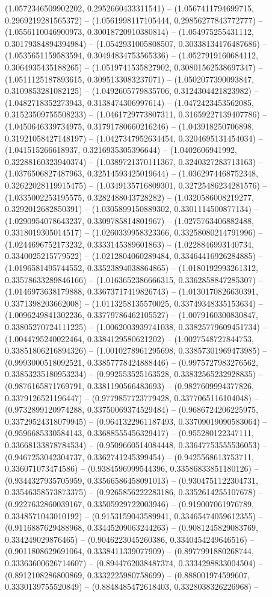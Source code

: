 (1.0572346509902202, 0.2952660433311541) -- (1.0567411794699715, 0.2969219281565372) -- (1.0561998117105444, 0.29856277843772777) -- (1.0556110046900973, 0.30018720910380814) -- (1.054975255431112, 0.30179384894394984) -- (1.0542931005808507, 0.30338134176487686) -- (1.0535651159583594, 0.30494834753565336) -- (1.0527919160684112, 0.3064935435188265) -- (1.0519741535827902, 0.30801562538697347) -- (1.0511125187893615, 0.3095133083237071) -- (1.0502077390093847, 0.3109853281082125) -- (1.0492605779835706, 0.3124304421823982) -- (1.0482718352273943, 0.3138474306997614) -- (1.0472423453562085, 0.31523509755508233) -- (1.0461729773807311, 0.31659227139407786) -- (1.0450646339734975, 0.31791780660216246) -- (1.043918250706898, 0.31921058427148197) -- (1.0427347952634454, 0.3204695131454034) -- (1.041515266618937, 0.3216935305396644) -- (1.0402606941992, 0.32288160323940374) -- (1.0389721370111367, 0.3240327283713163) -- (1.0376506827487963, 0.32514593425019644) -- (1.0362974468752348, 0.32622028119915475) -- (1.0349135716809301, 0.32725486234281576) -- (1.0335002253195575, 0.3282488043728282) -- (1.0320586008219277, 0.3292012682850391) -- (1.0305899150889302, 0.3301114500877134) -- (1.0290954078643237, 0.3309785814801967) -- (1.0275763406882488, 0.3318019305014517) -- (1.0260339958323366, 0.33258080214791996) -- (1.0244696752173232, 0.3333145389601863) -- (1.0228846993140734, 0.3340025215779522) -- (1.0212804060289484, 0.33464416926284885) -- (1.0196581495744552, 0.33523894038864865) -- (1.0180192993261312, 0.33578633289846166) -- (1.0163652386666315, 0.3362858847285307) -- (1.0146973638179888, 0.33673717419826743) -- (1.0130170826630391, 0.3371398203662008) -- (1.0113258135570025, 0.33749348335153634) -- (1.0096249841302236, 0.33779786462105527) -- (1.0079160300830847, 0.33805270724111225) -- (1.0062003939741038, 0.33825779609451734) -- (1.0044795240022464, 0.3384129580621202) -- (1.0027548727844753, 0.33851806216894326) -- (1.0010278961295698, 0.33857301969473985) -- (0.9993000518092521, 0.33857778424888446) -- (0.9975727983276562, 0.33853235180953234) -- (0.992553525163528, 0.33832565232928835) -- (0.9876165871769791, 0.3381190566483693) -- (0.9827609994377826, 0.3379126521196447) -- (0.9779857723779428, 0.3377065116104048) -- (0.9732899120974288, 0.33750069374529484) -- (0.9686724206225975, 0.33729524318079945) -- (0.9641322961187493, 0.33709019090583064) -- (0.9596685330584143, 0.33688555456329417) -- (0.955280122347111, 0.33668133878784534) -- (0.9509660514084448, 0.33647753555536053) -- (0.9467253042304737, 0.3362741245399454) -- (0.9425568613753711, 0.336071073474586) -- (0.9384596999544396, 0.33586833851180126) -- (0.9344327935705959, 0.33566586458091013) -- (0.9304751122304731, 0.33546358573873375) -- (0.9265856222283186, 0.3352614255107678) -- (0.9227632860039167, 0.33505929722003946) -- (0.919007061976789, 0.3348571043010192) -- (0.9153159043589941, 0.33465474059612355) -- (0.9116887629488968, 0.33445209063244263) -- (0.9081245829083769, 0.334249029876465) -- (0.9046223045260386, 0.3340454249646516) -- (0.9011808629691064, 0.3338411339077909) -- (0.8977991880268744, 0.33363600626714607) -- (0.8944762038487374, 0.3334298833004504) -- (0.8912108286800869, 0.3332225980758699) -- (0.888001974599607, 0.3330139755520849) -- (0.8848485472618403, 0.3328038326226968) -- 